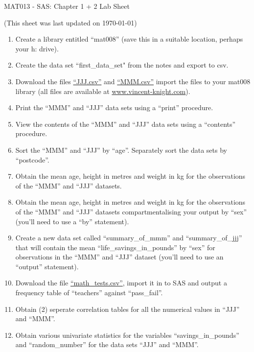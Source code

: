 \documentclass[12pt]{article}
\begin{document}
\begin{center}
\huge{MAT013 - SAS: Chapter 1 + 2 Lab Sheet}\\
\begin{center}
\tiny{(This sheet was last updated on \today)}
\end{center}
\end{center}

\begin{enumerate}
\item Create a library entitled ``mat008'' (save this in a suitable location, perhaps your h: drive).
\item Create the data set ``first\_data\_set" from the notes and export to csv.
\item Download the files \href{https://docs.google.com/file/d/0Bx_zrw5uAafbVlNkSzJNWHFWSkU/edit}{``JJJ.csv''} and  \href{https://docs.google.com/file/d/0Bx_zrw5uAafbSlYwcGtPUXl2Rlk/edit}{``MMM.csv''} import the files to your mat008 library (all files are available at \url{www.vincent-knight.com}).
\item Print the ``MMM'' and ``JJJ'' data sets using a ``print'' procedure.
\item View the contents of the ``MMM'' and ``JJJ'' data sets using a ``contents'' procedure.
\item Sort the ``MMM'' and ``JJJ'' by ``age''. Separately sort the data sets by ``postcode''.
\item Obtain the mean age, height in metres and weight in kg for the observations of the ``MMM'' and ``JJJ'' datasets. 
\item Obtain the mean age, height in metres and weight in kg for the observations of the ``MMM'' and ``JJJ'' datasets compartmentalising your output by ``sex'' (you'll need to use a ``by'' statement).
\item Create a new data set called ``summary\_of\_mmm'' and ``summary\_of\_jjj'' that will contain the mean ``life\_savings\_in\_pounds'' by ``sex'' for observations in the ``MMM'' and ``JJJ'' dataset (you'll need to use an ``output'' statement).
\item Download the file \href{https://docs.google.com/file/d/0Bx_zrw5uAafbdFNZUUZFblhfZGc/edit}{``math\_tests.csv''}, import it in to SAS and output a frequency table of ``teachers'' against ``pass\_fail''.
\item Obtain (2) seperate correlation tables for all the numerical values in ``JJJ'' and ``MMM''.
\item Obtain various univariate statistics for the variables ``savings\_in\_pounds'' and ``random\_number'' for the data sets ``JJJ'' and ``MMM''.

\end{enumerate}
\end{document}
